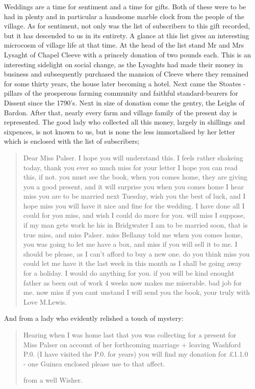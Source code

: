 Weddings are a time for sentiment and a time for gifts. Both of these were to be had in plenty and in particular a handsome marble clock from the people of the village. As for sentiment, not only was the list of subscribers to this gift recorded, but it has descended to us in its entirety. A glance at this list gives an interesting microcosm of village life at that time. At the head of the list stand Mr and Mrs Lysaght of Chapel Cleeve with a princely donation of two pounds each. This is an interesting sidelight on social change, as the Lysaghts had made their money in business and subsequently purchased the mansion of Cleeve where they remained for some thirty years, the house later becoming a hotel. Next came the Stoates - pillars of the prosperous farming community and faithful standard-bearers for Dissent since the 1790's. Next in size of donation come the gentry, the Leighs of Bardon. After that, nearly every farm and village family of the present day is represented. The good lady who collected all this money, largely in shillings and sixpences, is not known to us, but is none the less immortalised by her letter which is enclosed with the list of subscribers;

\begin{quote}
Dear Miss Palser. I hope you will understand this. I feels rather shakeing today, thank you ever so much miss for your letter I hope you can read this, if not. you must see the book, when you comes home, they are giving you a good present, and it will surprise you when you comes home I hear miss you are to be married next Tuesday, wish you the best of luck, and I hope miss you will have it nice and fine for the wedding. I have done all I could for you miss, and wish I could do more for you. will miss I suppose, if my man gets work he his in Bridgwater I am to be married soon, that is true miss, and miss Palser. miss Bellamy told me when you comes home, you was going to let me have a box, and miss if you will sell it to me. I should be please, as I can't afford to buy a new one. do you think miss you could let me have it the last week in this month as I shall be going away for a holiday. I would do anything for you. if you will be kind enought father as been out of work 4 weeks now makes me miserable. bad job for me. now miss if you cant unstand I will send you the book, your truly with Love M.Lewis.
\end{quote}

And from a lady who evidently relished a touch of mystery:


\begin{quote}
Hearing when I was home last that you was collecting for a present for Miss Palser on account of her forthcoming marriage + leaving Washford P.0. (I have visited the P.0. for years) you will find my donation for £1.1.0 - one Guinea enclosed please use to that affect.

from a well Wisher.
\end{quote}

